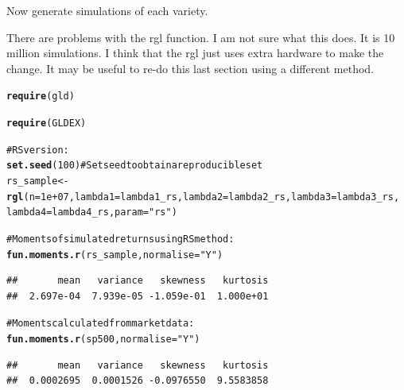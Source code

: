 \documentclass[12pt, a4paper, oneside]{article}\usepackage{graphicx, color}
\makeatletter
\newcommand{\hlfunctioncall}[1]{\textcolor[rgb]{0.501960784313725,0,0.329411764705882}{\textbf{#1}}}%
\newcommand{\hlstring}[1]{\textcolor[rgb]{0.6,0.6,1}{#1}}%
\newcommand{\hlcomment}[1]{\textcolor[rgb]{0.180392156862745,0.6,0.341176470588235}{#1}}%
\newenvironment{kframe}{%
 \def\at@end@of@kframe{}%
 \ifinner\ifhmode%
  \def\at@end@of@kframe{\end{minipage}}%
  \begin{minipage}{\columnwidth}%
 \fi\fi%
 \def\FrameCommand##1{\hskip\@totalleftmargin \hskip-\fboxsep
 \colorbox{shadecolor}{##1}\hskip-\fboxsep
     \hskip-\linewidth \hskip-\@totalleftmargin \hskip\columnwidth}%
 \MakeFramed {\advance\hsize-\width
   \@totalleftmargin\z@ \linewidth\hsize
   \@setminipage}}%
 {\par\unskip\endMakeFramed%
 \at@end@of@kframe}
\newenvironment{knitrout}{}{} %
\makeatother
\begin{document}
Now generate simulations of each variety. 

There are problems with the rgl function.  I am not sure what this does.  It is 10 million simulations.  I think that the rgl just uses extra hardware to make the change. It may be useful to re-do this last section using a different method. 
\begin{knitrout}
\color{fgcolor}\begin{kframe}
\begin{alltt}
\hlfunctioncall{require}(gld)
\end{alltt}


{\ttfamily\noindent\itshape\color{messagecolor}{\#\# Loading required package: gld}}\begin{alltt}
\hlfunctioncall{require}(GLDEX)
\end{alltt}


{\ttfamily\noindent\itshape\color{messagecolor}{\#\# Loading required package: GLDEX}}

{\ttfamily\noindent\itshape\color{messagecolor}{\#\# Loading required package: cluster}}

{\ttfamily\noindent\itshape\color{messagecolor}{\#\# \\\#\# Attaching package: 'GLDEX'}}

{\ttfamily\noindent\itshape\color{messagecolor}{\#\# The following object is masked from 'package:moments':\\\#\# \\\#\#\ \ \ \  kurtosis, skewness}}\begin{alltt}
\hlcomment{# RS version:}
\hlfunctioncall{set.seed}(100)  \hlcomment{# Set seed to obtain a reproducible set}
rs_sample <- \hlfunctioncall{rgl}(n = 1e+07, lambda1 = lambda1_rs, lambda2 = lambda2_rs, lambda3 = lambda3_rs, 
    lambda4 = lambda4_rs, param = \hlstring{"rs"})

\hlcomment{# Moments of simulated returns using RS method:}
\hlfunctioncall{fun.moments.r}(rs_sample, normalise = \hlstring{"Y"})
\end{alltt}
\begin{verbatim}
##       mean   variance   skewness   kurtosis 
##  2.697e-04  7.939e-05 -1.059e-01  1.000e+01
\end{verbatim}
\begin{alltt}

\hlcomment{# Moments calculated from market data:}
\hlfunctioncall{fun.moments.r}(sp500, normalise = \hlstring{"Y"})
\end{alltt}
\begin{verbatim}
##       mean   variance   skewness   kurtosis 
##  0.0002695  0.0001526 -0.0976550  9.5583858
\end{verbatim}
\begin{alltt}


\end{alltt}
\end{kframe}
\end{knitrout}
\end{document}
